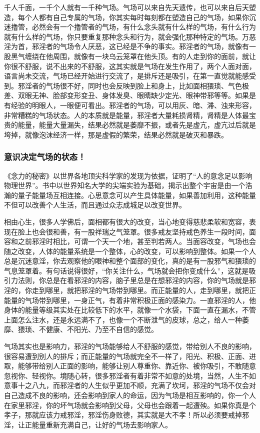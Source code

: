 千人千面，一千个人就有一千种气场。气场可以来自先天遗传，也可以来自后天塑造，每个人都有自己专属的气场，你其实每时每刻都在塑造自己的气场，如果你沉迷撸管，必然会有一个撸管者的气场，有什么念头就有什么样的气场，有什么行为就有什么样的气场，你只要重复那种念头和行为，就会强化那种特定的气场。万恶淫为首，邪淫者的气场令人厌恶，这已经是不争的事实。邪淫者的气场，就像有一股黑气缠绕在他周围，就像有一块乌云笼罩在他头顶。有的人走到你的面前，就让你很不舒服，说不出来的不舒服，这其实就是气场在发生作用了，两个人面对面，语言尚未交流，气场已经开始进行交流了，是排斥还是吸引，在第一直觉就能感受到。邪淫者的气场很不好，同时也会反映到脸上和身上，比如面相猥琐、气色极差、双眼无神、脸部变形变丑、身体发臭、眼睛缺少定光、眼神带邪等等。如果是有经验的明眼人，一眼便可看出。邪淫者的气场，可以用灰、暗、滞、浊来形容，非常糟糕的气场状态。人的本质就是能量，邪淫者大量耗损肾精，肾精是人体最宝贵的能量，能量大量漏失，结果必然就是萎靡不振，或者先是虚亢，虚亢过后就是垮掉，就像泡沫经济一样，那是虚假的繁荣，结果必然就是破灭和暴跌。

\subsubsection{意识决定气场的状态！}

《念力的秘密》以世界各地顶尖科学家的发现为依据，证明了“人的意念足以影响物理世界”。书中以世界知名大学的尖端实验为基础，揭示出整个宇宙是由一个浩瀚的量子能量场互相连接。心思意念可以产生具体能量，如果善加利用，这种能量不但可以改善个人生活，而且通过众志成城足以改变世界。

相由心生，很多人学佛后，面相都有很大的改变，当心地变得慈悲柔软和宽容，表现在脸上也会很和善，有一股祥瑞之气笼罩。很多戒友坚持戒色养生一段时间，面容和之前邪淫时相比，可谓一个天一个地，甚至判若两人。当面容改变，气场也会随之改变，人体的能量系统是一个整体，心的改变，可以影响到整体。如果一个人总是沉迷意淫，你去观察他的眼神和整个面部的变化，真的是有一股邪气和猥琐的气息笼罩着。有句话说得很好，“你关注什么，气场就会把你变成什么”，这就是吸引力法则，你总是在看邪淫的内容，脑子里总是在想邪淫的内容，你的气场就是邪淫的，你走到哪里，就把邪淫的气场带到哪里。而正能量的人，走到哪里，就把正能量的气场带到哪里，一身正气，有着非常积极正面的感染力。一直邪淫的人，他身体的能量等级其实处在比较低下的水平，就像一个水袋，下面一直在漏水，不管上面怎么注水，还是永远满不了，也像一个不断泄气的皮球，总之，给人一种萎靡、猥琐、不健康、不阳光、乃至不自信的感觉。

气场其实也是影响力，邪淫的气场能够给人不舒服的感觉，带给别人不良的影响，很容易遭到别人的排斥；而正能量的气场就完全不一样了，阳光、积极、正面、进取，能够带给别人正面的影响，能够让别人尊重你、靠近你、被你吸引，不敢随意忽视你、轻视你。境随心转，很多邪淫者有着非常不如意的处境，当然，人生不如意事十之八九，而邪淫者的人生似乎更加不顺，充满了坎坷，邪淫的气场不仅会对自己造成不良的影响，还会影响到家人的命运，因为气场是相互影响的，你一个人在家里邪淫，你的坏气场就会影响到父母，父母也会跟着一起遭殃。如果你真是个孝子，那就应该力戒邪淫，邪淫伤身败德，其实就是大不孝！所以必须要戒掉邪淫，让正能量重新充满自己，让好的气场去影响家人。


